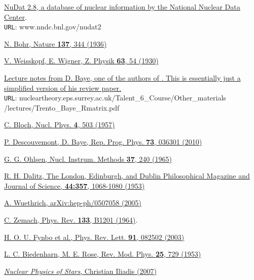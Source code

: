 \begin{thebibliography}{}
\href{https://www.nndc.bnl.gov/nudat2/}{NuDat 2.8, a database of nuclear information by the National Nuclear Data Center}. \\
\texttt{URL}: www.nndc.bnl.gov/nudat2

\href{https://doi.org/10.1038/137344a0}{N. Bohr, Nature \textbf{137}, 344 (1936)}

\href{https://doi.org/10.1007/BF01336768}{V. Weisskopf, E. Wigner, Z. Physik \textbf{63}, 54 (1930)}

\href{http://nucleartheory.eps.surrey.ac.uk/Talent_6_Course/Other_materials/lectures/Trento_Baye_Rmatrix.pdf}{Lecture notes from D. Baye, one of the authors of \cite{Baye}. This is essentially just a simplified version of his review paper.}\\
\texttt{URL}: nucleartheory.eps.surrey.ac.uk/Talent\_6\_Course/Other\_materials\\/lectures/Trento\_Baye\_Rmatrix.pdf

\href{https://www.sciencedirect.com/science/article/abs/pii/0029558287900587}{C. Bloch, Nucl. Phys. \textbf{4}, 503 (1957)}

\href{https://doi.org/10.1088/0034-4885/73/3/036301}{P. Descouvemont, D. Baye, Rep. Prog. Phys. \textbf{73}, 036301 (2010)}

\href{https://doi.org/10.1016/0029-554X(65)90368-X}{G. G. Ohlsen, Nucl. Instrum. Methods \textbf{37}, 240 (1965)}

\href{https://doi.org/10.1080/14786441008520365}{R. H. Dalitz, The London, Edinburgh, and Dublin Philosophical Magazine and Journal of Science, \textbf{44:357}, 1068-1080 (1953)}

\href{https://arxiv.org/abs/hep-ph/0507058}{A. Wuethrich, arXiv:hep-ph/0507058 (2005)}

\href{https://doi.org/10.1103/PhysRev.133.B1201}{C. Zemach, Phys. Rev. \textbf{133}, B1201 (1964)}.

\href{https://doi.org/10.1103/PhysRevLett.91.082502}{H. O. U. Fynbo et al., Phys. Rev. Lett. \textbf{91}, 082502 (2003)}

\href{https://doi.org/10.1103/RevModPhys.25.729}{L. C. Biedenharn, M. E. Rose, Rev. Mod. Phys. \textbf{25}, 729 (1953)}

\href{https://doi.org/10.1002/9783527618750}{\textit{Nuclear Physics of Stars}, Christian Iliadis (2007)}


\end{thebibliography}
